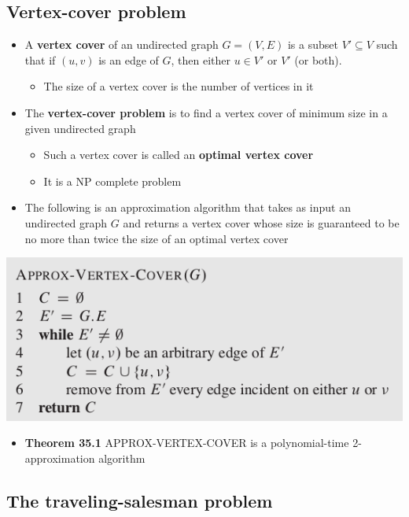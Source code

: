 \documentclass[11pt]{article}
\begin{document}
\subsection{Vertex-cover problem}
\label{sec:org68fd126}
\begin{itemize}
\item A \textbf{vertex cover} of an undirected graph \(G=(V,E)\) is a subset \(V' \subseteq V\) such that if \((u,v)\) is an edge of \(G\), then either \(u \in V'\) or \(V'\) (or both).
\begin{itemize}
\item The size of a vertex cover is the number of vertices in it
\end{itemize}

\item The \textbf{vertex-cover problem} is to find a vertex cover of minimum size in a given undirected graph
\begin{itemize}
\item Such a vertex cover is called an \textbf{optimal vertex cover}
\item It is a NP complete problem
\end{itemize}

\item The following is an approximation algorithm that takes as input an undirected graph \(G\) and returns a vertex cover whose size is guaranteed to be no more than twice the size of an optimal vertex cover
\end{itemize}
\begin{center}
\includegraphics[width=.9\linewidth]{Approximation Algorithms/screenshot_2019-04-25_11-42-05.png}
\end{center}

\begin{itemize}
\item \textbf{Theorem 35.1} APPROX-VERTEX-COVER is a polynomial-time 2-approximation algorithm
\end{itemize}

\subsection{The traveling-salesman problem}
\label{sec:orgc2894df}
\end{document}
